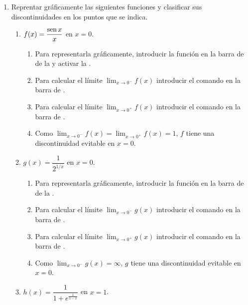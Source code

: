 \begin{enumerate}[leftmargin=*]
\item Reprentar gráficamente las siguientes funciones y clasificar sus discontinuidades en los puntos que se indica.
      \begin{enumerate}
      \item  $f(x)=\dfrac{\operatorname{sen} x}{x}$ en $x=0$.

            \begin{indication}
            \begin{enumerate}
            \item Para representarla gráficamente, introducir la función  en la barra de  de la  y activar la .
            \item Para calcular el límite $\lim_{x\rightarrow 0^-}f(x)$ introducir el comando  en la barra de .
            \item Para calcular el límite $\lim_{x\rightarrow 0^+}f(x)$ introducir el comando  en la barra de .
            \item Como $\lim_{x\rightarrow 0^-}f(x)=\lim_{x\rightarrow 0^+}f(x)=1$, $f$ tiene una discontinuidad evitable en $x=0$.
            \end{enumerate}
            \end{indication}
      \item $g(x)=\dfrac{1}{2^{1/x}}$ en $x=0$.
            \begin{indication}
            \begin{enumerate}
            \item Para representarla gráficamente, introducir la función  en la barra de  de la .
            \item Para calcular el límite $\lim_{x\rightarrow 0^-}g(x)$ introducir el comando  en la barra de .
            \item Para calcular el límite $\lim_{x\rightarrow 0^+}g(x)$ introducir el comando  en la barra de .
            \item Como $\lim_{x\rightarrow 0^-}g(x)=\infty$, $g$ tiene una discontinuidad evitable en $x=0$.
            \end{enumerate}
            \end{indication}
      \item $h(x)=\dfrac{1}{1+e^{\frac{1}{1-x}}}$ en $x=1$.

\end{enumerate}
\end{enumerate}
